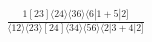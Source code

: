 \documentclass[varwidth, border=5pt]{standalone}
\begin{document}
\begin{my}
$\begin{gathered}
\scriptscriptstyle\frac{1[23]⟨24⟩⟨36⟩⟨6|1+5|2]}{⟨12⟩⟨23⟩[24]⟨34⟩⟨56⟩⟨2|3+4|2]}
\end{gathered}$
\end{my}
\end{document}
